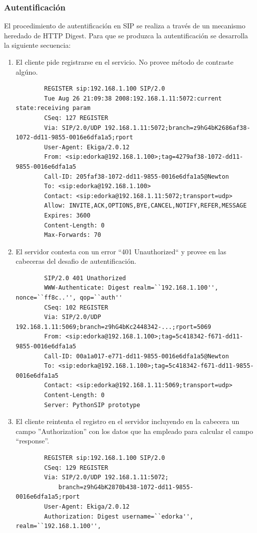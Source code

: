 \documentclass[a4paper,spanish,12pt]{book}
\begin{document}
\subsubsection{Autentificación}
El procedimiento de autentificación en SIP se realiza a trav\'es de un mecanismo heredado de HTTP Digest. Para que se produzca la autentificación se desarrolla la siguiente secuencia:
\begin{enumerate}
	\item El cliente pide registrarse en el servicio. No provee m\'etodo de contraste algúno.
		\scriptsize
		\begin{verbatim}
		REGISTER sip:192.168.1.100 SIP/2.0
		Tue Aug 26 21:09:38 2008:192.168.1.11:5072:current state:receiving param
		CSeq: 127 REGISTER
		Via: SIP/2.0/UDP 192.168.1.11:5072;branch=z9hG4bK2686af38-1072-dd11-9855-0016e6dfa1a5;rport
		User-Agent: Ekiga/2.0.12
		From: <sip:edorka@192.168.1.100>;tag=4279af38-1072-dd11-9855-0016e6dfa1a5
		Call-ID: 205faf38-1072-dd11-9855-0016e6dfa1a5@Newton
		To: <sip:edorka@192.168.1.100>
		Contact: <sip:edorka@192.168.1.11:5072;transport=udp>
		Allow: INVITE,ACK,OPTIONS,BYE,CANCEL,NOTIFY,REFER,MESSAGE
		Expires: 3600
		Content-Length: 0
		Max-Forwards: 70
		\end{verbatim}
		\normalsize
	\item El servidor contesta con un error ``401 Unauthorized`` y provee en las cabeceras del desafio de autentificación.
		\scriptsize
		\begin{verbatim}
		SIP/2.0 401 Unathorized
		WWW-Authenticate: Digest realm=``192.168.1.100'', nonce=``ff8c..'', qop=``auth''
		CSeq: 102 REGISTER
		Via: SIP/2.0/UDP 192.168.1.11:5069;branch=z9hG4bKc2448342-...;rport=5069
		From: <sip:edorka@192.168.1.100>;tag=5c418342-f671-dd11-9855-0016e6dfa1a5
		Call-ID: 00a1a017-e771-dd11-9855-0016e6dfa1a5@Newton
		To: <sip:edorka@192.168.1.100>;tag=5c418342-f671-dd11-9855-0016e6dfa1a5
		Contact: <sip:edorka@192.168.1.11:5069;transport=udp>
		Content-Length: 0
		Server: PythonSIP prototype
		\end{verbatim}
		\normalsize
	\item El cliente reintenta el registro en el servidor incluyendo en la cabecera un campo ''Authorization'' con los datos que ha empleado para calcular el campo ``response''.
		\scriptsize
		\begin{verbatim}
		REGISTER sip:192.168.1.100 SIP/2.0
		CSeq: 129 REGISTER
		Via: SIP/2.0/UDP 192.168.1.11:5072;
			branch=z9hG4bK2870b438-1072-dd11-9855-0016e6dfa1a5;rport
		User-Agent: Ekiga/2.0.12
		Authorization: Digest username=``edorka'', realm=``192.168.1.100'', 

\end{verbatim}
\end{enumerate}
\end{document}
